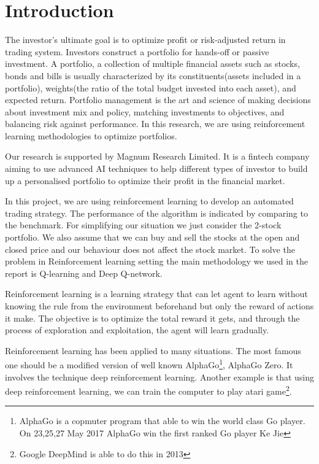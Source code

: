 \chapter{Introduction}\label{Ch:Introduction}

The investor’s ultimate goal is to optimize profit or risk-adjusted return in trading system. Investors construct a portfolio for hands-off or passive investment. A portfolio, a collection of multiple financial assets such as stocks, bonds and bills is usually characterized by its constituents(assets included in a portfolio), weights(the ratio of the total budget invested into each asset), and expected return. Portfolio management is the art and science of making decisions about investment mix and policy, matching investments to objectives, and balancing risk against performance. In this research, we are using reinforcement learning methodologies to optimize portfolios. 

Our research is supported by Magnum Research Limited. It is a fintech company aiming to use advanced AI techniques to help different types of investor to build up a personalised portfolio to optimize their profit in the financial market.

In this project, we are using reinforcement learning to develop an automated trading strategy. The performance of the algorithm is indicated by comparing to the benchmark. For simplifying our situation we just consider the 2-stock portfolio. We also assume that we can buy and sell the stocks at the open and closed price and our behaviour does not affect the stock market. To solve the problem in Reinforcement learning setting the main methodology we used in the report is Q-learning and Deep Q-network. 

Reinforcement learning is a learning strategy that can let agent to learn without knowing the rule from the environment beforehand but only the reward of actions it make. The objective is to optimize the total reward it gets, and through the process of exploration and exploitation, the agent will learn gradually.

Reinforcement learning has been applied to many situations. The most famous one should be a modified version of well known AlphaGo\footnote{AlphaGo is a copmuter program that able to win the world class Go player. On 23,25,27 May 2017 AlphaGo win the first ranked Go player Ke Jie}, AlphaGo Zero. It involves the technique deep reinforcement learning. Another example is that using deep reinforcement learning, we can train the computer to play atari game\footnote{Google DeepMind is able to do this in 2013}. 